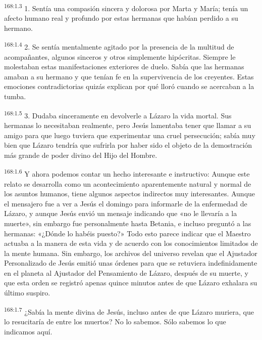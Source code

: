 \par 
\textsuperscript{168:1.3} 1. Sentía una compasión sincera y dolorosa por Marta y María; tenía un afecto humano real y profundo por estas hermanas que habían perdido a su hermano.

\par 
\textsuperscript{168:1.4} 2. Se sentía mentalmente agitado por la presencia de la multitud de acompañantes, algunos sinceros y otros simplemente hipócritas. Siempre le molestaban estas manifestaciones exteriores de duelo. Sabía que las hermanas amaban a su hermano y que tenían fe en la supervivencia de los creyentes. Estas emociones contradictorias quizás explican por qué lloró cuando se acercaban a la tumba.

\par 
\textsuperscript{168:1.5} 3. Dudaba sinceramente en devolverle a Lázaro la vida mortal. Sus hermanas lo necesitaban realmente, pero Jesús lamentaba tener que llamar a su amigo para que luego tuviera que experimentar una cruel persecución; sabía muy bien que Lázaro tendría que sufrirla por haber sido el objeto de la demostración más grande de poder divino del Hijo del Hombre.

\par 
\textsuperscript{168:1.6} Y ahora podemos contar un hecho interesante e instructivo: Aunque este relato se desarrolla como un acontecimiento aparentemente natural y normal de los asuntos humanos, tiene algunos aspectos indirectos muy interesantes. Aunque el mensajero fue a ver a Jesús el domingo para informarle de la enfermedad de Lázaro, y aunque Jesús envió un mensaje indicando que «no le llevaría a la muerte», sin embargo fue personalmente hasta Betania, e incluso preguntó a las hermanas: «¿Dónde lo habéis puesto?» Todo esto parece indicar que el Maestro actuaba a la manera de esta vida y de acuerdo con los conocimientos limitados de la mente humana. Sin embargo, los archivos del universo revelan que el Ajustador Personalizado de Jesús emitió unas órdenes para que se retuviera indefinidamente en el planeta al Ajustador del Pensamiento de Lázaro, después de su muerte, y que esta orden se registró apenas quince minutos antes de que Lázaro exhalara su último suspiro.

\par 
\textsuperscript{168:1.7} ¿Sabía la mente divina de Jesús, incluso antes de que Lázaro muriera, que lo resucitaría de entre los muertos? No lo sabemos. Sólo sabemos lo que indicamos aquí.

